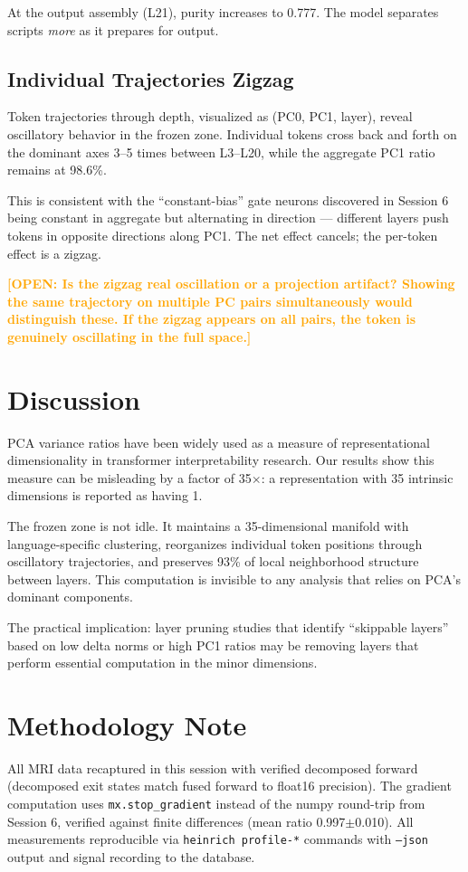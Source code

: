 \documentclass[11pt]{article}
\newcommand{\open}[1]{\textcolor{orange}{\textbf{[OPEN: #1]}}}
\begin{document}
At the output assembly (L21), purity increases to 0.777. The model separates scripts \textit{more} as it prepares for output.

\subsection{Individual Trajectories Zigzag}

Token trajectories through depth, visualized as (PC0, PC1, layer), reveal oscillatory behavior in the frozen zone. Individual tokens cross back and forth on the dominant axes 3--5 times between L3--L20, while the aggregate PC1 ratio remains at 98.6\%.

This is consistent with the ``constant-bias'' gate neurons discovered in Session 6 being constant in aggregate but alternating in direction --- different layers push tokens in opposite directions along PC1. The net effect cancels; the per-token effect is a zigzag.

\open{Is the zigzag real oscillation or a projection artifact? Showing the same trajectory on multiple PC pairs simultaneously would distinguish these. If the zigzag appears on all pairs, the token is genuinely oscillating in the full space.}

\section{Discussion}

PCA variance ratios have been widely used as a measure of representational dimensionality in transformer interpretability research. Our results show this measure can be misleading by a factor of 35$\times$: a representation with 35 intrinsic dimensions is reported as having 1.

The frozen zone is not idle. It maintains a 35-dimensional manifold with language-specific clustering, reorganizes individual token positions through oscillatory trajectories, and preserves 93\% of local neighborhood structure between layers. This computation is invisible to any analysis that relies on PCA's dominant components.

The practical implication: layer pruning studies that identify ``skippable layers'' based on low delta norms or high PC1 ratios may be removing layers that perform essential computation in the minor dimensions.

\section{Methodology Note}

All MRI data recaptured in this session with verified decomposed forward (decomposed exit states match fused forward to float16 precision). The gradient computation uses \texttt{mx.stop\_gradient} instead of the numpy round-trip from Session 6, verified against finite differences (mean ratio 0.997$\pm$0.010). All measurements reproducible via \texttt{heinrich profile-*} commands with \texttt{--json} output and signal recording to the database.
\end{document}
